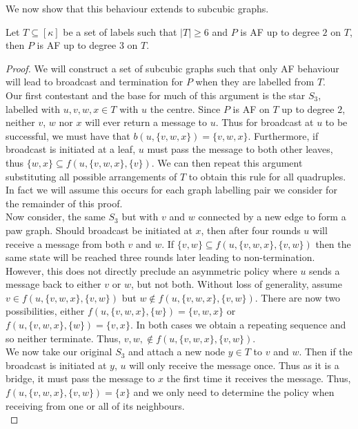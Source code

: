 We now show that this behaviour extends to subcubic graphs.
\begin{lemma}
    \label{lemma: degree 2 to 3}
    Let $T \subseteq [\kappa]$ be a set of labels such that $|T|\geq 6$ and $P$ is AF up to degree $2$ on $T$, then $P$ is AF up to degree $3$ on $T$.
\end{lemma}
\begin{proof}
    We will construct a set of subcubic graphs such that only AF behaviour will lead to broadcast and termination for $P$ when they are labelled from $T$.\\
    Our first contestant and the base for much of this argument is the star $S_3$, labelled with $u,v,w,x \in T$ with $u$ the centre.
    Since $P$ is AF on $T$ up to degree $2$, neither $v$, $w$ nor $x$ will ever return a message to $u$.
    Thus for broadcast at $u$ to be successful, we must have that $b(u, \{v,w,x\})=\{v,w,x\}$.
    Furthermore, if broadcast is initiated at a leaf, $u$ must pass the message to both other leaves, thus $\{w,x\}\subseteq f(u,\{v,w,x\},\{v\})$.
    We can then repeat this argument substituting all possible arrangements of $T$ to obtain this rule for all quadruples.
    In fact we will assume this occurs for each graph labelling pair we consider for the remainder of this proof.\\
    Now consider, the same $S_3$ but with $v$ and $w$ connected by a new edge to form a paw graph.
    Should broadcast be initiated at $x$, then after four rounds $u$ will receive a message from both $v$ and $w$.
    If $\{v,w\} \subseteq f(u,\{v,w,x\},\{v,w\})$ then the same state will be reached three rounds later leading to non-termination.
    However, this does not directly preclude an asymmetric policy where $u$ sends a message back to either $v$ or $w$, but not both.  
    Without loss of generality, assume $v \in f(u,\{v,w,x\},\{v,w\})$ but $w \notin f(u,\{v,w,x\},\{v,w\})$. 
    There are now two possibilities, either $f(u,\{v,w,x\},\{w\})=\{v,w,x\}$ or $f(u,\{v,w,x\},\{w\})=\{v,x\}$. 
    In both cases we obtain a repeating sequence and so neither terminate. 
    Thus, $v,w, \notin f(u,\{v,w,x\},\{v,w\})$.\\
    We now take our original $S_3$ and attach a new node $y \in T$ to $v$ and $w$.
    Then if the broadcast is initiated at $y$, $u$ will only receive the message once. Thus as it is a bridge, it must pass the message to $x$ the first time it receives the message. Thus, $f(u,\{v,w,x\},\{v,w\})=\{x\}$ and we only need to determine the policy when receiving from one or all of its neighbours.\\


\end{proof}
